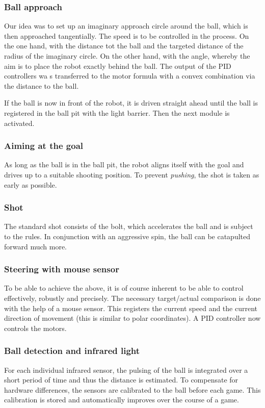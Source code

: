 \subsubsection{Ball approach}
Our idea was to set up an imaginary approach circle around the ball, which is then approached tangentially. The speed is to be controlled in the process.
On the one hand, with the distance tot the ball and the targeted distance of the radius of the imaginary circle.
On the other hand, with the angle, whereby the aim is to place the robot exactly behind the ball. 
The output of the PID controllers wa s transferred to the motor formula with a convex combination via the distance to the ball.

If the ball is now in front of the robot, it is driven straight ahead until the ball is registered in the ball pit with the light barrier. Then the next module is activated.

\subsubsection{Aiming at the goal}
As long as the ball is in the ball pit, the robot aligns itself with the goal and drives up to a suitable shooting position. To prevent \textit{pushing}, the shot is taken as early as possible.

\subsubsection{Shot}
The standard shot consists of the bolt, which accelerates the ball and is subject to the rules. In conjunction with an aggressive spin, the ball can be catapulted forward much more.

\subsubsection{Steering with mouse sensor}
To be able to achieve the above, it is of course inherent to be able to control effectively, robustly and precisely.
The necessary target/actual comparison is done with the help of a mouse sensor.
This registers the current speed and the current direction of movement (this is similar to polar coordinates). A PID controller now controls the motors.

\subsubsection{Ball detection and infrared light}
For each individual infrared sensor, the pulsing of the ball is integrated over a short period of time and thus the distance is estimated.
To compensate for hardware differences, the sensors are calibrated to the ball before each game. This calibration is stored and automatically improves over the course of a game. 

